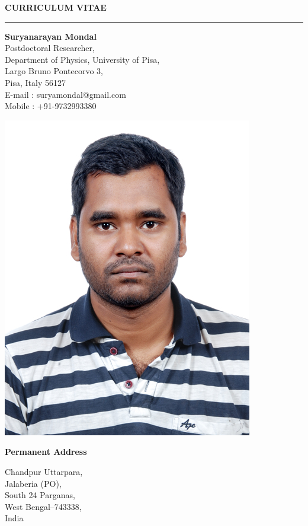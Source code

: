 \documentclass[12pt]{article}
\begin{document}
\hypersetup{urlcolor=DarkBlue}
\pagestyle{plain}
\flushleft
{\bf {CURRICULUM VITAE }}\\
\noindent\rule{18cm}{0.2pt}
\vspace{0.05cm}
\noindent

\begin{minipage}{0.8\textwidth}
 {\bf{Suryanarayan Mondal}} \\[0.4em]
 Postdoctoral Researcher,\\
 Department of Physics,
 University of Pisa,\\
 Largo Bruno Pontecorvo 3,\\
 Pisa, Italy 56127 \\
 E-mail : suryamondal@gmail.com\\
 Mobile : +91-9732993380 \\[0.1em]
\end{minipage}%
\begin{minipage}{0.5\textwidth}
  \includegraphics[width=0.45\linewidth]{./SMA454.jpg}
\end{minipage}

\vspace{0.6cm}
{\bf {Permanent Address }}\\
\begin{minipage}{0.8\textwidth}
  \vspace{0.3cm}
  Chandpur Uttarpara,\\
  Jalaberia (PO),\\
  South 24 Parganas,\\
  West Bengal--743338,\\
  India
\end{minipage}
\end{document}
